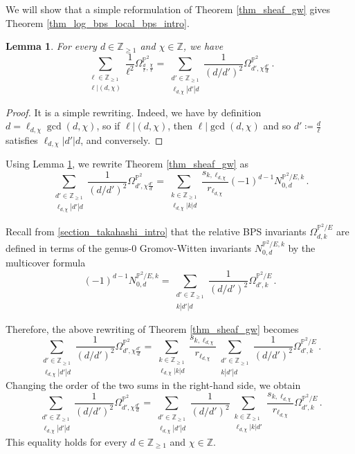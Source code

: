 \documentclass[11pt,letterpaper]{amsart}
\newtheorem{lem}[defn]{Lemma}
\newcommand\PP{\mathbb P}
\newcommand\Z{\mathbb Z}
\begin{document}
We will show that a simple reformulation of Theorem \ref{thm_sheaf_gw} 
gives Theorem \ref{thm_log_bps_local_bps_intro}.



\begin{lem} \label{lem_rewriting}
For every $d \in \Z_{\geqslant 1}$ and $\chi \in \Z$, we have 
\[ \sum_{\substack{\ell \in \Z_{\geqslant 1}\\
\ell|(d,\chi)}} \frac{1}{\ell^2} \Omega_{\frac{d}{\ell},\frac{\chi}{\ell}}^{\PP^2}
=\sum_{\substack{d'\in \Z_{\geqslant 1}\\
\ell_{d,\chi}|d'|d}} \frac{1}{(d/d')^2}
\Omega^{\PP^2}_{d',\chi \frac{d'}{d}}\,.\]
\end{lem}

\begin{proof}
It is a simple rewriting.
Indeed, we have by definition 
$d=\ell_{d,\chi} \gcd(d,\chi)$, so if $\ell|(d,\chi)$, then 
$\ell|\gcd(d,\chi)$ and so $d' \coloneq \frac{d}{\ell}$ satisfies $\ell_{d,\chi}|d'|d$, and conversely.
\end{proof}

Using Lemma \ref{lem_rewriting}, we rewrite Theorem \ref{thm_sheaf_gw} as
\[ 
 \sum_{\substack{d'\in \Z_{\geqslant 1}\\
\ell_{d,\chi}|d'|d}} \frac{1}{(d/d')^2}
\Omega^{\PP^2}_{d',\chi \frac{d'}{d}}
=
 \sum_{\substack{k \in \Z_{\geqslant 1} \\ \ell_{d,\chi}|k|d}}
\frac{s_{k,\ell_{d,\chi}}}{r_{\ell_{d,\chi}}} (-1)^{d-1} N_{0,d}^{\PP^2/E,k} \,.\]

Recall from \cref{section_takahashi_intro} that the relative BPS invariants 
$\Omega_{d,k}^{\PP^2/E}$ are defined in terms of the genus-$0$
Gromov-Witten invariants 
$N_{0,d}^{\PP^2/E,k}$ by the multicover formula
\[ (-1)^{d-1} N_{0,d}^{\PP^2/E,k}=\sum_{\substack{d' \in \Z_{\geqslant 1}\\ k|d'|d}} \frac{1}{(d/d')^2} \Omega^{\PP^2/E}_{d', k}\,.\]

Therefore, the above rewriting of Theorem \ref{thm_sheaf_gw} becomes
\[ 
 \sum_{\substack{d'\in \Z_{\geqslant 1}\\
\ell_{d,\chi}|d'|d}} \frac{1}{(d/d')^2}
\Omega^{\PP^2}_{d',\chi \frac{d'}{d}}
=\sum_{\substack{k \in \Z_{\geqslant 1} \\ \ell_{d,\chi}|k|d}}
\frac{s_{k,\ell_{d,\chi}}}{r_{\ell_{d,\chi}}} \sum_{\substack{d' \in \Z_{\geqslant 1}\\ k|d'|d}} \frac{1}{(d/d')^2} \Omega^{\PP^2/E}_{d', k} \,.\]
Changing the order of the two sums in the right-hand side, we obtain
\begin{equation} \label{eq_sums}
 \sum_{\substack{d'\in \Z_{\geqslant 1}\\
\ell_{d,\chi}|d'|d}} \frac{1}{(d/d')^2}
\Omega^{\PP^2}_{d',\chi \frac{d'}{d}}
= \sum_{\substack{d'\in \Z_{\geqslant 1}\\
\ell_{d,\chi}|d'|d}} \frac{1}{(d/d')^2}
\sum_{\substack{k \in \Z_{\geqslant 1} \\ \ell_{d,\chi}|k|d'}}
\frac{s_{k,\ell_{d,\chi}}}{r_{\ell_{d,\chi}}} 
\Omega^{\PP^2/E}_{d', k} \,.
\end{equation}
This equality holds for every $d \in \Z_{\geqslant 1}$ and $\chi \in \Z$. 
\end{document}
